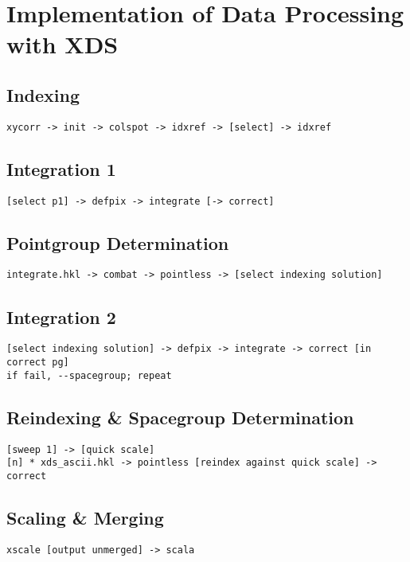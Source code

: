 \documentclass[a4paper, 11pt]{article}
\begin{document}
\section{Implementation of Data Processing with XDS}

\subsection{Indexing}

\begin{verbatim}
xycorr -> init -> colspot -> idxref -> [select] -> idxref
\end{verbatim}


\subsection{Integration 1}

\begin{verbatim}
[select p1] -> defpix -> integrate [-> correct]
\end{verbatim}

\subsection{Pointgroup Determination}

\begin{verbatim}
integrate.hkl -> combat -> pointless -> [select indexing solution]
\end{verbatim}

\subsection{Integration 2}

\begin{verbatim}
[select indexing solution] -> defpix -> integrate -> correct [in correct pg]
if fail, --spacegroup; repeat
\end{verbatim}

\subsection{Reindexing \& Spacegroup Determination}

\begin{verbatim}
[sweep 1] -> [quick scale]
[n] * xds_ascii.hkl -> pointless [reindex against quick scale] -> correct
\end{verbatim}

\subsection{Scaling \& Merging}

\begin{verbatim}
xscale [output unmerged] -> scala
\end{verbatim}
\end{document}
